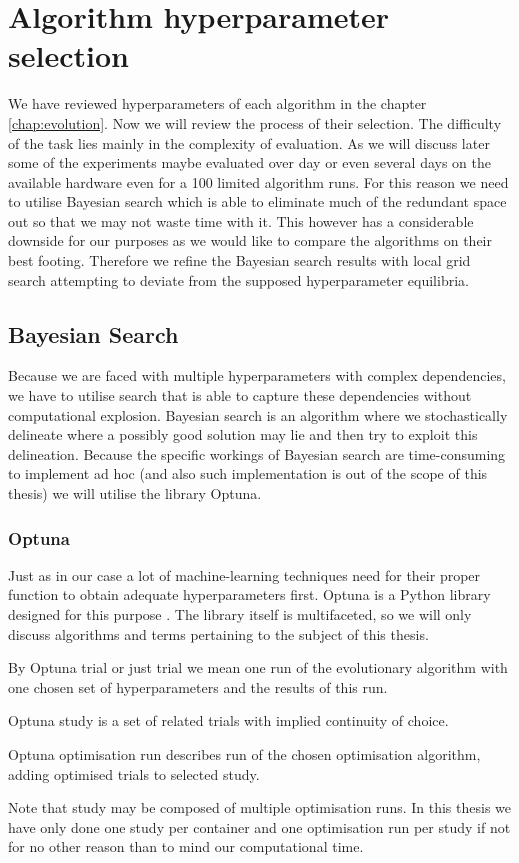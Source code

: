 \section{Algorithm hyperparameter selection}
We have reviewed hyperparameters of each algorithm in the chapter \ref{chap:evolution}. Now we will review the process of their selection. The difficulty of the task lies mainly in the complexity of evaluation. As we will discuss later some of the experiments maybe evaluated over day or even several days on the available hardware even for a 100 limited algorithm runs. For this reason we need to utilise Bayesian search which is able to eliminate much of the redundant space out so that we may not waste time with it. This however has a considerable downside for our purposes as we would like to compare the algorithms on their best footing. Therefore we refine the Bayesian search results with local grid search attempting to deviate from the supposed hyperparameter equilibria.

\subsection{Bayesian Search}
\label{sec:bayesSearch}
Because we are faced with multiple hyperparameters with complex dependencies, we have to utilise search that is able to capture these dependencies without computational explosion.
Bayesian search is an algorithm where we stochastically delineate where a possibly good solution may lie and then try to exploit this delineation. Because the specific workings of Bayesian search are time-consuming to implement ad hoc (and also such implementation is out of the scope of this thesis) we will utilise the library Optuna.

\subsubsection{Optuna}
Just as in our case a lot of machine-learning techniques need for their proper function to obtain adequate hyperparameters first. Optuna is a Python library designed for this purpose \citep{akiba2019optuna}. The library itself is multifaceted, so we will only discuss algorithms and terms pertaining to the subject of this thesis.
\begin{defn}
	By Optuna trial or just trial we mean one run of the evolutionary algorithm with one chosen set of hyperparameters and the results of this run.
\end{defn}
\begin{defn}
	Optuna study is a set of related trials with implied continuity of choice. 
\end{defn}
\begin{defn}
	Optuna optimisation run describes run of the chosen optimisation algorithm, adding optimised trials to selected study.
\end{defn}
Note that study may be composed of multiple optimisation runs. In this thesis we have only done one study per container and one optimisation run per study if not for no other reason than to mind our computational time.

